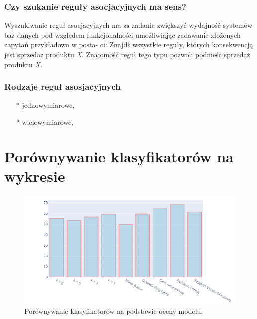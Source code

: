 \documentclass{article}
\begin{document}
\subsubsection{Czy szukanie reguły asocjacyjnych ma sens?}
Wyszukiwanie reguł asocjacyjnych ma za zadanie zwiększyć wydajność systemów baz danych pod względem funkcjonalności umożliwiając zadawanie złożonych zapytań przykładowo w posta- ci: Znajdź wszystkie reguły, których konsekwencją jest sprzedaż produktu \emph{X}. Znajomość reguł tego typu pozwoli podnieść sprzedaż produktu \emph{X}.

\subsubsection{Rodzaje reguł asosjacyjnych}
\begin{itemize}
\item[*] jednowymiarowe, 
\item[*] wielowymiarowe, 
\end{itemize}
\section{Porównywanie klasyfikatorów na wykresie}
\begin{figure}[!htb]
\centering
\includegraphics[width=\textwidth]{image/wykres.png}
\caption{Porównywanie klasyfikatorów na podstawie oceny modelu.}
\end{figure}
\end{document}
